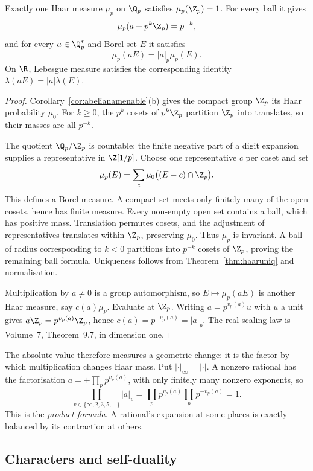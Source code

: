 \begin{proposition}\label{prop:haarqp}
Exactly one Haar measure $\mu_p$ on $\Q_p$ satisfies $\mu_p(\Z_p)=1$. For every ball it gives
\[\mu_p(a+p^k\Z_p)=p^{-k},\]
and for every $a\in\Q_p^*$ and Borel set $E$ it satisfies
\[\mu_p(aE)=|a|_p\mu_p(E).\]
On $\R$, Lebesgue measure satisfies the corresponding identity $\lambda(aE)=|a|\lambda(E)$.
\end{proposition}
\begin{proof}
Corollary~\ref{cor:abelianamenable}(b) gives the compact group $\Z_p$ its Haar probability $\mu_0$. For $k\ge0$, the $p^k$ cosets of $p^k\Z_p$ partition $\Z_p$ into translates, so their masses are all $p^{-k}$.

The quotient $\Q_p/\Z_p$ is countable: the finite negative part of a digit expansion supplies a representative in $\Z[1/p]$. Choose one representative $c$ per coset and set
\[\mu_p(E)=\sum_c\mu_0\bigl((E-c)\cap\Z_p\bigr).\]
This defines a Borel measure. A compact set meets only finitely many of the open cosets, hence has finite measure. Every non-empty open set contains a ball, which has positive mass. Translation permutes cosets, and the adjustment of representatives translates within $\Z_p$, preserving $\mu_0$. Thus $\mu_p$ is invariant. A ball of radius corresponding to $k<0$ partitions into $p^{-k}$ cosets of $\Z_p$, proving the remaining ball formula. Uniqueness follows from Theorem~\ref{thm:haaruniq} and normalisation.

Multiplication by $a\ne0$ is a group automorphism, so $E\mapsto\mu_p(aE)$ is another Haar measure, say $c(a)\mu_p$. Evaluate at $\Z_p$. Writing $a=p^{v_p(a)}u$ with $u$ a unit gives $a\Z_p=p^{v_p(a)}\Z_p$, hence $c(a)=p^{-v_p(a)}=|a|_p$. The real scaling law is Volume~7, Theorem~9.7, in dimension one.
\end{proof}

The absolute value therefore measures a geometric change: it is the factor by which multiplication changes Haar mass. Put $|\cdot|_\infty=|\cdot|$. A nonzero rational has the factorisation $a=\pm\prod_pp^{v_p(a)}$, with only finitely many nonzero exponents, so
\[\prod_{v\in\{\infty,2,3,5,\dots\}}|a|_v
 =\prod_pp^{v_p(a)}\prod_pp^{-v_p(a)}=1.
\]
This is the \emph{product formula}. A rational's expansion at some places is exactly balanced by its contraction at others.

\subsection*{Characters and self-duality}

